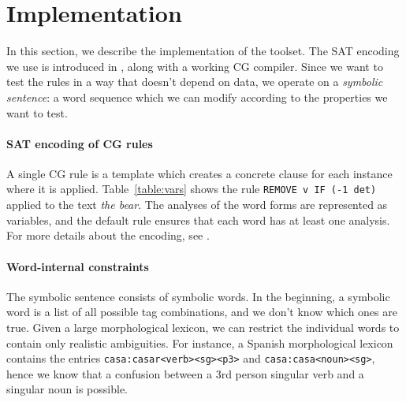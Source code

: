 \section{Implementation}
\label{sec:implementation}

In this section, we describe the implementation of the toolset.
The SAT encoding we use is introduced in \cite{listenmaa_claessen2015}, along with a working CG compiler.
Since we want to test the rules in a way that doesn't depend on data, we operate on a \emph{symbolic sentence}: a word sequence which we can modify according to the properties we want to test.

\paragraph{SAT encoding of CG rules}

A single CG rule is a template which creates a concrete clause for each instance where it is applied.
Table~\ref{table:vars} shows the rule \texttt{REMOVE v IF (-1 det)} applied to the text \emph{the bear}.
The analyses of the word forms are represented as variables, and
the default rule ensures that each word has at least one analysis.
For more details about the encoding, see \cite{listenmaa_claessen2015}.



\paragraph{Word-internal constraints}

The symbolic sentence consists of symbolic words.
In the beginning, a symbolic word is a list of all possible tag combinations, and we don't know which ones are true.
Given a large morphological lexicon, we can restrict the individual words to contain only realistic ambiguities. 
For instance, a Spanish morphological lexicon contains the entries \texttt{casa:casar<verb><sg><p3>} and \texttt{casa:casa<noun><sg>}, hence we know that a confusion between a 3rd person singular verb and a singular noun is possible. 

